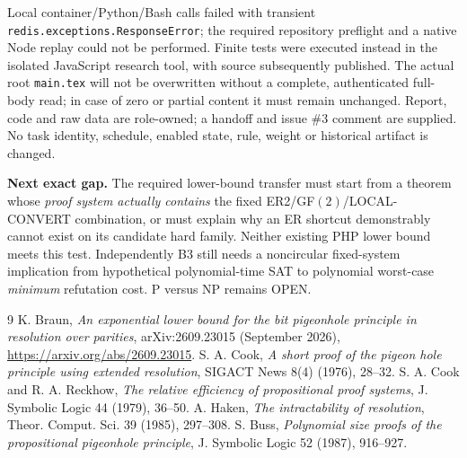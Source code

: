 \documentclass[11pt]{article}
\begin{document}
Local container/Python/Bash calls failed with transient \texttt{redis.exceptions.ResponseError}; the required repository preflight and a native Node replay could not be performed. Finite tests were executed instead in the isolated JavaScript research tool, with source subsequently published. The actual root \texttt{main.tex} will not be overwritten without a complete, authenticated full-body read; in case of zero or partial content it must remain unchanged. Report, code and raw data are role-owned; a handoff and issue \#3 comment are supplied. No task identity, schedule, enabled state, rule, weight or historical artifact is changed.

\noindent\textbf{Next exact gap.} The required lower-bound transfer must start from a theorem whose \emph{proof system actually contains} the fixed ER2/GF$(2)$/LOCAL-CONVERT combination, or must explain why an ER shortcut demonstrably cannot exist on its candidate hard family. Neither existing PHP lower bound meets this test. Independently B3 still needs a noncircular fixed-system implication from hypothetical polynomial-time SAT to polynomial worst-case \emph{minimum} refutation cost. P versus NP remains OPEN.

\begin{thebibliography}{9}
 K. Braun, \emph{An exponential lower bound for the bit pigeonhole principle in resolution over parities}, arXiv:2609.23015 (September 2026), \url{https://arxiv.org/abs/2609.23015}.
 S. A. Cook, \emph{A short proof of the pigeon hole principle using extended resolution}, SIGACT News 8(4) (1976), 28--32.
 S. A. Cook and R. A. Reckhow, \emph{The relative efficiency of propositional proof systems}, J. Symbolic Logic 44 (1979), 36--50.
 A. Haken, \emph{The intractability of resolution}, Theor. Comput. Sci. 39 (1985), 297--308.
 S. Buss, \emph{Polynomial size proofs of the propositional pigeonhole principle}, J. Symbolic Logic 52 (1987), 916--927.
\end{thebibliography}
\end{document}
